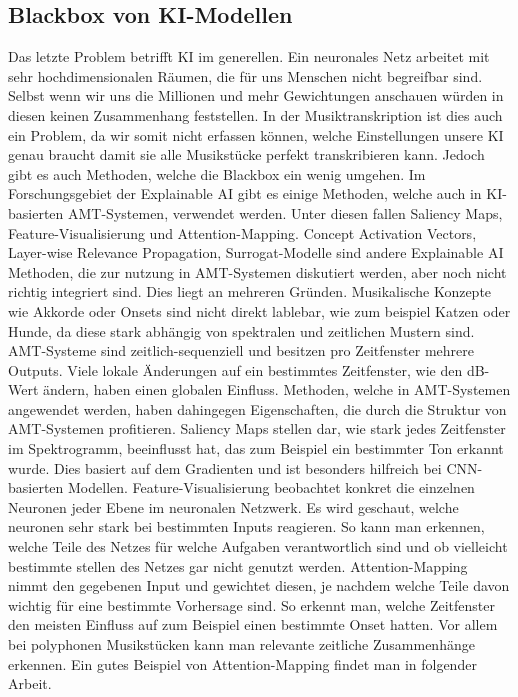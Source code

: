 \subsection{Blackbox von KI-Modellen}
Das letzte Problem betrifft KI im generellen.
Ein neuronales Netz arbeitet mit sehr hochdimensionalen Räumen, die für uns Menschen nicht begreifbar sind.
Selbst wenn wir uns die Millionen und mehr Gewichtungen anschauen würden in diesen keinen Zusammenhang feststellen.
In der Musiktranskription ist dies auch ein Problem, da wir somit nicht erfassen können,
welche Einstellungen unsere KI genau braucht damit sie alle Musikstücke perfekt transkribieren kann.
Jedoch gibt es auch Methoden, welche die Blackbox ein wenig umgehen.
Im Forschungsgebiet der Explainable AI gibt es einige Methoden,
welche auch in KI-basierten AMT-Systemen, verwendet werden.
Unter diesen fallen Saliency Maps, Feature-Visualisierung und Attention-Mapping.
Concept Activation Vectors, Layer-wise Relevance Propagation, Surrogat-Modelle sind andere Explainable AI Methoden,
die zur nutzung in AMT-Systemen diskutiert werden, aber noch nicht richtig integriert sind.
Dies liegt an mehreren Gründen.
Musikalische Konzepte wie Akkorde oder Onsets sind nicht direkt lablebar, wie zum beispiel Katzen oder Hunde,
da diese stark abhängig von spektralen und zeitlichen Mustern sind.
AMT-Systeme sind zeitlich-sequenziell und besitzen pro Zeitfenster mehrere Outputs.
Viele lokale Änderungen auf ein bestimmtes Zeitfenster, wie den dB-Wert ändern, haben einen globalen Einfluss.
Methoden, welche in AMT-Systemen angewendet werden,
haben dahingegen Eigenschaften, die durch die Struktur von AMT-Systemen profitieren.
Saliency Maps stellen dar, wie stark jedes Zeitfenster im Spektrogramm,
beeinflusst hat, das zum Beispiel ein bestimmter Ton erkannt wurde.
Dies basiert auf dem Gradienten und ist besonders hilfreich bei CNN-basierten Modellen.
Feature-Visualisierung beobachtet konkret die einzelnen Neuronen jeder Ebene im neuronalen Netzwerk.
Es wird geschaut, welche neuronen sehr stark bei bestimmten Inputs reagieren.
So kann man erkennen, welche Teile des Netzes für welche Aufgaben verantwortlich sind
und ob vielleicht bestimmte stellen des Netzes gar nicht genutzt werden.
Attention-Mapping nimmt den gegebenen Input und gewichtet diesen,
je nachdem welche Teile davon wichtig für eine bestimmte Vorhersage sind.
So erkennt man, welche Zeitfenster den meisten Einfluss auf zum Beispiel einen bestimmte Onset hatten.
Vor allem bei polyphonen Musikstücken kann man relevante zeitliche Zusammenhänge erkennen.
Ein gutes Beispiel von Attention-Mapping findet man in folgender Arbeit.
\cite{cheuk2021revisiting}
